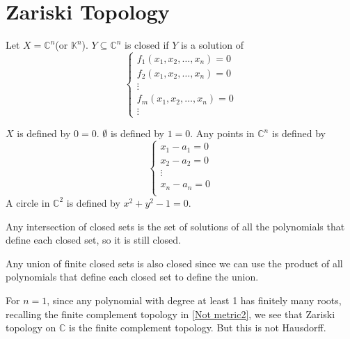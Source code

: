 \documentclass[main.tex]{subfiles}
\begin{document}
\section{Zariski Topology} 
\par Let $X = \mathbb{C}^n$(or $\mathbb{K}^n$). $Y \subseteq \mathbb{C}^n$ is closed if $Y$ is a solution of 
\begin{equation}
    \begin{cases}
    f_1(x_1, x_2, \ldots, x_n) = 0 \\
    f_2(x_1, x_2, \ldots, x_n) = 0 \\
    \vdots \\
    f_m(x_1, x_2, \ldots, x_n) = 0\\
    \vdots 
    \end{cases}
\end{equation} 
\par $X$ is defined by $0 = 0$. $\emptyset$ is defined by $1 = 0$. Any points in $\mathbb{C}^n$ is defined by
\begin{equation}
    \begin{cases}
    x_1 - a_1 = 0 \\
    x_2 - a_2 = 0 \\
    \vdots \\
    x_n - a_n = 0\\
    \end{cases}
\end{equation}
A circle in $\mathbb{C}^2$ is defined by $x^2 + y^2 - 1 = 0$. 
\par Any intersection of closed sets is the set of solutions of all the polynomials that define each closed set, so it is still closed. 
\par Any union of finite closed sets is also closed since we can use the product of all polynomials that define each closed set to define the union. 
\par For $n = 1$, since any polynomial with degree at least 1 has finitely many roots, recalling the finite complement topology in \ref{Not metric2}, we see that Zariski topology on $\mathbb{C}$ is the finite complement topology. But this is not Hausdorff. 
\end{document}

